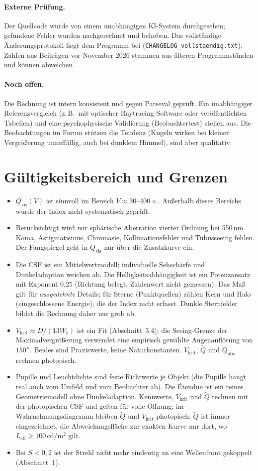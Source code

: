 \documentclass[11pt,a4paper]{article}
\newcommand{\Qvis}{Q_{\mathrm{vis}}}
\newcommand{\Vkrit}{V_{\mathrm{krit}}}
\begin{document}
\paragraph{Externe Prüfung.} Der Quellcode wurde von einem unabhängigen KI-System durchgesehen; gefundene Fehler wurden nachgerechnet und behoben. Das vollständige Änderungsprotokoll liegt dem Programm bei (\texttt{CHANGELOG\_vollstaendig.txt}). Zahlen aus Beiträgen vor November 2026 stammen aus älteren Programmständen und können abweichen.

\paragraph{Noch offen.} Die Rechnung ist intern konsistent und gegen Parseval geprüft. Ein unabhängiger Referenzvergleich (z.\,B.\ mit optischer Raytracing-Software oder veröffentlichten Tabellen) und eine psychophysische Validierung (Beobachtertest) stehen aus. Die Beobachtungen im Forum stützen die Tendenz (Kugeln wirken bei kleiner Vergrößerung unauffällig, auch bei dunklem Himmel), sind aber qualitativ.

\section{Gültigkeitsbereich und Grenzen}
\begin{itemize}
\item $\Qvis(V)$ ist sinnvoll im Bereich $V\approx30$--$400\times$. Außerhalb dieses Bereichs wurde der Index nicht systematisch geprüft.
\item Berücksichtigt wird nur sphärische Aberration vierter Ordnung bei 550\,nm. Koma, Astigmatismus, Chromasie, Kollimationsfehler und Tubusseeing fehlen. Der Fangspiegel geht in $\Qvis$ nur über die Zusatzkurve ein.
\item Die CSF ist ein Mittelwertmodell; individuelle Sehschärfe und Dunkeladaption weichen ab. Die Helligkeitsabhängigkeit ist ein Potenzansatz mit Exponent 0,25 (Richtung belegt, Zahlenwert nicht gemessen). Das Maß gilt für \emph{ausgedehnte} Details; für Sterne (Punktquellen) zählen Kern und Halo (eingeschlossene Energie), die der Index nicht erfasst. Dunkle Sternfelder bildet die Rechnung daher nur grob ab.
\item $\Vkrit\approx D/(13W_b)$ ist ein Fit (Abschnitt~3.4); die Seeing-Grenze der Maximalvergrößerung verwendet eine empirisch gewählte Augenauflösung von $150''$. Beides sind Praxiswerte, keine Naturkonstanten. $\Vkrit$, $\tilde Q$ und $Q_{\mathrm{abs}}$ rechnen photopisch.
\item Pupille und Leuchtdichte sind feste Richtwerte je Objekt (die Pupille hängt real auch vom Umfeld und vom Beobachter ab). Die Étendue ist ein reines Geometriemodell ohne Dunkeladaption. Kennwerte, $\Vkrit$ und $\tilde Q$ rechnen mit der photopischen CSF und gelten für volle Öffnung; im Wahrnehmungsdiagramm bleiben $\tilde Q$ und $\Vkrit$ photopisch: $\tilde Q$ ist immer eingezeichnet, die Abweichungsfläche zur exakten Kurve nur dort, wo $L_{\mathrm{eff}}\ge100$\,cd/m$^2$ gilt.
\item Bei $S<0{,}2$ ist der Strehl nicht mehr eindeutig an eine Wellenfront gekoppelt (Abschnitt~1).
\end{itemize}
\end{document}
